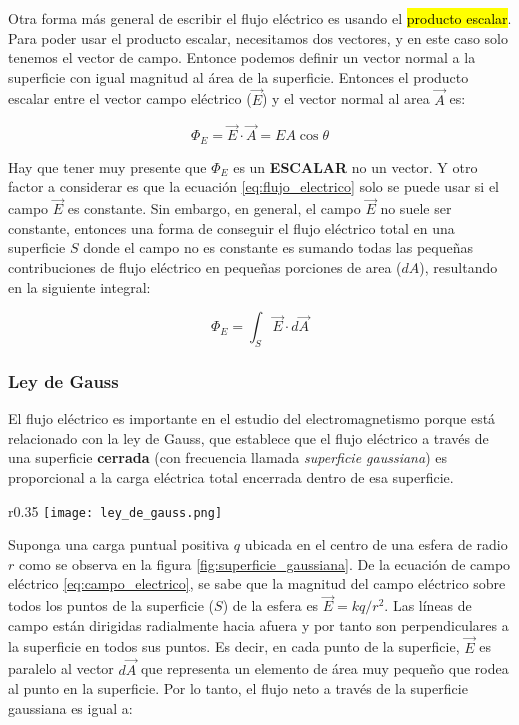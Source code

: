 Otra forma más general de escribir el flujo eléctrico es usando el \hl{producto escalar}. Para poder usar el producto escalar, necesitamos dos vectores, y en este caso solo tenemos el vector de campo. Entonce podemos definir un vector normal a la superficie con igual magnitud al área de la superficie. Entonces el producto escalar entre el vector campo eléctrico (\(\vec{E}\)) y el vector normal al area \(\vec{A}\) es:

\begin{equation}
    \Phi_E = \vec{E} \cdot \vec{A} = E A \cos \theta
    \label{eq:flujo_electrico}
\end{equation}

Hay que tener muy presente que \(\Phi_E\) es un \textbf{ESCALAR} no un vector. Y otro factor a considerar es que la ecuación \eqref{eq:flujo_electrico} solo se puede usar si el campo \(\vec{E}\) es constante. Sin embargo, en general, el campo \(\vec{E}\) no suele ser constante, entonces una forma de conseguir el flujo eléctrico total en una superficie \(S\) donde el campo no es constante es sumando todas las pequeñas contribuciones de flujo eléctrico en pequeñas porciones de area (\(dA\)), resultando en la siguiente integral:

\begin{equation}
    \Phi_E = \int_{S} \vec{E} \cdot d\vec{A}
    \label{eq:flujo_electrico_integral}
\end{equation}

\subsubsection{Ley de Gauss}

El flujo eléctrico es importante en el estudio del electromagnetismo porque está relacionado con la ley de Gauss, que establece que el flujo eléctrico a través de una superficie \textbf{cerrada} (con frecuencia llamada \textit{superficie gaussiana}) es proporcional a la carga eléctrica total encerrada dentro de esa superficie.

\begin{wrapfigure}{r}{0.35\textwidth}
    \centering
    \texttt{[image: ley\_de\_gauss.png]}
    \caption{Superficie gaussiana esférica de radio \(r\) que rodea una carga puntual \(q\).}
    \label{fig:superficie_gaussiana}
\end{wrapfigure}

Suponga una carga puntual positiva \(q\) ubicada en el centro de una esfera de radio \(r\) como se observa en la figura \ref{fig:superficie_gaussiana}. De la ecuación de campo eléctrico \eqref{eq:campo_electrico}, se sabe que la magnitud del campo eléctrico sobre todos los puntos de la superficie (\(S\)) de la esfera es \(\vec{E} = k q/r^2\). Las líneas de campo están dirigidas radialmente hacia afuera y por tanto son perpendiculares a la superficie en todos sus puntos. Es decir, en cada punto de la superficie, \(\vec{E}\) es paralelo al vector \(d\vec{A}\) que representa un elemento de área muy pequeño que rodea al punto en la superficie. Por lo tanto, el flujo neto a través de la superficie gaussiana es igual a:

